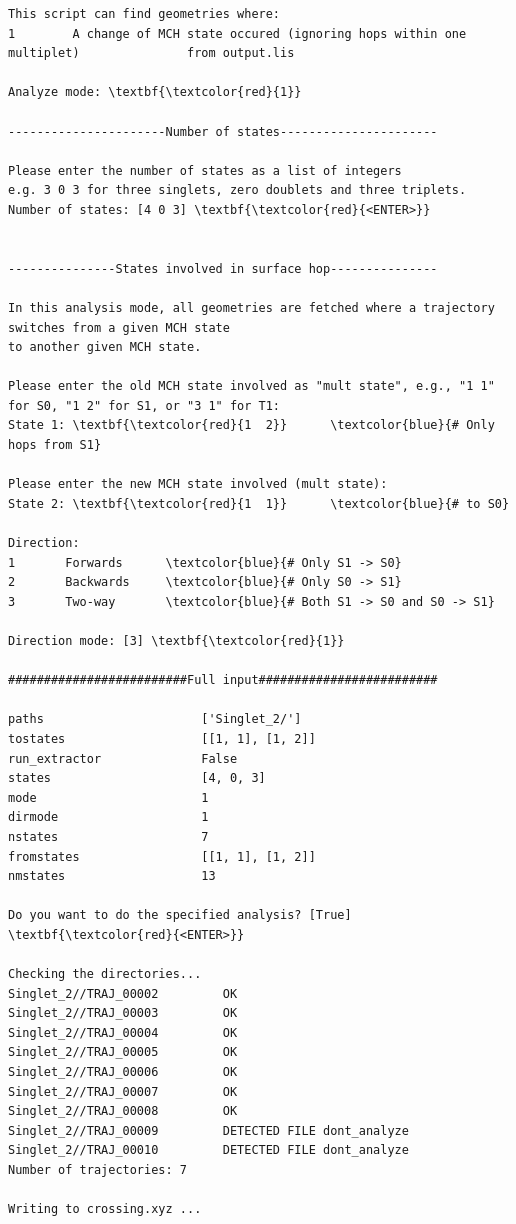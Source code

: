 \documentclass[a4paper,11pt,DIV=15,openany]{scrbook}
\begin{document}
\begin{oframed}
\begin{Verbatim}[commandchars=\\\{\}]
This script can find geometries where:
1        A change of MCH state occured (ignoring hops within one multiplet)               from output.lis

Analyze mode: \textbf{\textcolor{red}{1}}

----------------------Number of states----------------------

Please enter the number of states as a list of integers
e.g. 3 0 3 for three singlets, zero doublets and three triplets.
Number of states: [4 0 3] \textbf{\textcolor{red}{<ENTER>}}


---------------States involved in surface hop---------------

In this analysis mode, all geometries are fetched where a trajectory switches from a given MCH state
to another given MCH state.

Please enter the old MCH state involved as "mult state", e.g., "1 1" for S0, "1 2" for S1, or "3 1" for T1:
State 1: \textbf{\textcolor{red}{1  2}}      \textcolor{blue}{# Only hops from S1}

Please enter the new MCH state involved (mult state):
State 2: \textbf{\textcolor{red}{1  1}}      \textcolor{blue}{# to S0}

Direction:
1       Forwards      \textcolor{blue}{# Only S1 -> S0}
2       Backwards     \textcolor{blue}{# Only S0 -> S1}
3       Two-way       \textcolor{blue}{# Both S1 -> S0 and S0 -> S1}

Direction mode: [3] \textbf{\textcolor{red}{1}}

#########################Full input#########################

paths                      ['Singlet_2/']
tostates                   [[1, 1], [1, 2]]
run_extractor              False
states                     [4, 0, 3]
mode                       1
dirmode                    1
nstates                    7
fromstates                 [[1, 1], [1, 2]]
nmstates                   13

Do you want to do the specified analysis? [True] \textbf{\textcolor{red}{<ENTER>}}

Checking the directories...
Singlet_2//TRAJ_00002         OK
Singlet_2//TRAJ_00003         OK
Singlet_2//TRAJ_00004         OK
Singlet_2//TRAJ_00005         OK
Singlet_2//TRAJ_00006         OK
Singlet_2//TRAJ_00007         OK
Singlet_2//TRAJ_00008         OK
Singlet_2//TRAJ_00009         DETECTED FILE dont_analyze
Singlet_2//TRAJ_00010         DETECTED FILE dont_analyze
Number of trajectories: 7

Writing to crossing.xyz ...
\end{Verbatim}
\end{oframed}
\end{document}
